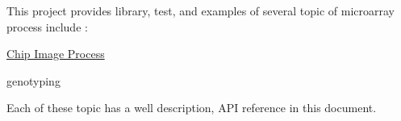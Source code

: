 This project provides library, test, and examples of several topic of microarray process include \-:
\begin{DoxyItemize}
\item \hyperlink{chip_image_process}{Chip Image Process}
\item genotyping
\end{DoxyItemize}

Each of these topic has a well description, A\-P\-I reference in this document. 